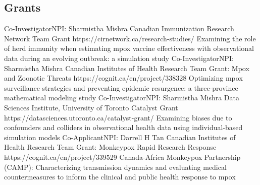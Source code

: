 \subsection{Grants}
  {Co-Investigator}{NPI: Sharmistha Mishra }
  {Canadian Immunization Research Network}
  {Team Grant}
  {https://cirnetwork.ca/research-studies/}
  {Examining the role of herd immunity when estimating mpox vaccine effectiveness with observational data during an evolving outbreak: a simulation study}
  {Co-Investigator}{NPI: Sharmistha Mishra }
  {Canadian Institutes of Health Research}
  {Team Grant: Mpox and Zoonotic Threats}
  {https://cognit.ca/en/project/338328}
  {Optimizing mpox surveillance strategies and preventing epidemic resurgence: a three-province mathematical modeling study}
  {Co-Investigator}{NPI: Sharmistha Mishra }
  {Data Sciences Institute, University of Toronto}
  {Catalyst Grant}
  {https://datasciences.utoronto.ca/catalyst-grant/}
  {Examining biases due to confounders and colliders in observational health data using individual-based simulation models}
  {Co-Applicant}{NPI: Darrell H Tan }
  {Canadian Institutes of Health Research}
  {Team Grant: Monkeypox Rapid Research Response}
  {https://cognit.ca/en/project/339529}
  {Canada-Africa Monkeypox Partnership (CAMP): Characterizing transmission dynamics and evaluating medical countermeasures to inform the clinical and public health response to mpox}
